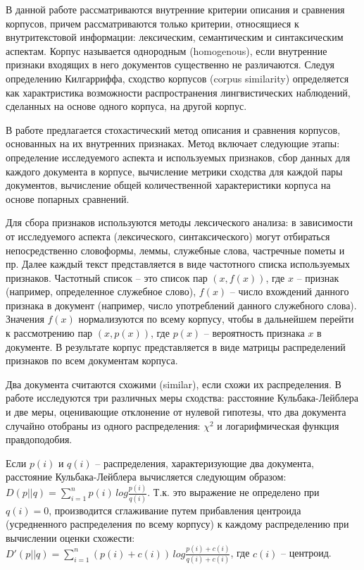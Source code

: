 В данной работе рассматриваются внутренние критерии описания и сравнения корпусов, причем рассматриваются только критерии, относящиеся к внутритекстовой информации: лексическим, семантическим и синтаксическим аспектам. Корпус называется однородным (homogenous), если внутренние признаки входящих в него документов существенно не различаются. Следуя определению Килгарриффа, сходство корпусов (corpus similarity) определяется как характристика возможности распространения лингвистических наблюдений, сделанных на основе одного корпуса, на другой корпус.

В работе предлагается стохастический метод описания и сравнения корпусов, основанных на их внутренних признаках. Метод включает следующие этапы: определение исследуемого аспекта и используемых признаков, сбор данных для каждого документа в корпусе, вычисление метрики сходства для каждой пары документов, вычисление общей количественной характеристики корпуса на основе попарных сравнений.

Для сбора признаков используются методы лексического анализа: в зависимости от исследуемого аспекта (лексического, синтаксического) могут отбираться непосредственно словоформы, леммы, служебные слова, частречные пометы и пр. Далее каждый текст представляется в виде частотного списка используемых признаков. Частотный список -- это список пар $(x, f(x))$, где $x$ -- признак (например, определенное служебное слово), $f(x)$ -- число вхождений данного признака в документ (например, число употреблений данного служебного слова). Значения $f(x)$ нормализуются по всему корпусу, чтобы в дальнейшем перейти к рассмотрению пар $(x, p(x))$, где $p(x)$ -- вероятность признака $x$ в документе. В результате корпус представляется в виде матрицы распределений признаков по всем документам корпуса.

Два документа считаются схожими (similar), если схожи их распределения. В работе исследуются три различных меры сходства: расстояние Кульбака-Лейблера и две меры, оценивающие отклонение от нулевой гипотезы, что два документа случайно отобраны из одного распределения: $\chi^2$ и логарифмическая функция правдоподобия.

Если $p(i)$ и $q(i)$ -- распределения, характеризующие два документа, расстояние Кульбака-Лейблера вычисляется следующим образом: $D(p||q) = \sum_{i=1}^{n}p(i)\,log\frac{p(i)}{q(i)}$. Т.к. это выражение не определено при $q(i)=0$, производится сглаживание путем прибавления центроида (усредненного распределения по всему корпусу) к каждому распределению при вычислении оценки схожести: $D'(p||q) = \sum_{i=1}^{n}(p(i)+c(i))\,log\frac{p(i)+c(i)}{q(i)+c(i)}$, где $c(i)$ -- центроид.

